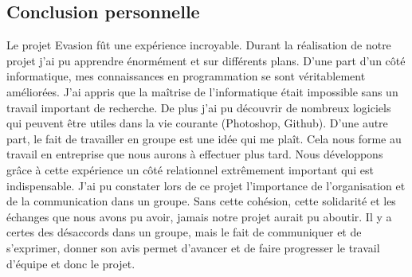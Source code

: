 \documentclass[12pt]{article}
\begin{document}
\subsection{Conclusion personnelle}
Le projet Evasion fût une expérience incroyable. Durant la réalisation de notre projet j'ai pu apprendre énormément et sur différents plans. D'une part d'un côté informatique, mes connaissances en programmation se sont véritablement améliorées. J'ai appris que la maîtrise de l'informatique était impossible sans un travail important de recherche. De plus j'ai pu découvrir de nombreux logiciels qui peuvent être utiles dans la vie courante (Photoshop, Github). D'une autre part, le fait de travailler en groupe est une idée qui me plaît. Cela nous forme au travail en entreprise que nous aurons à effectuer plus tard. Nous développons grâce à cette expérience un côté relationnel extrêmement important qui est indispensable. J'ai pu constater lors de ce projet l'importance de l'organisation et de la communication dans un groupe. Sans cette cohésion, cette solidarité et les échanges que nous avons pu avoir, jamais notre projet aurait pu aboutir. Il y a certes des désaccords dans un groupe, mais le fait de communiquer et de s'exprimer, donner son avis permet d'avancer et de faire progresser le travail d'équipe et donc le projet.

\newpage
\thispagestyle{empty}
\pagestyle{fancyplain} \chead{} 
\listoffigures
\end{document}
